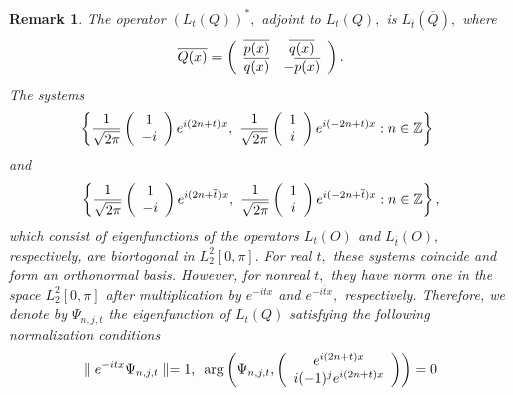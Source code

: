 \documentclass{article}%
\newtheorem{remark}{Remark}
\begin{document}
\begin{remark}
The operator $\left(  L_{t}(Q)\right)  ^{\ast},$ adjoint to $L_{t}(Q),$ is
$L_{\overline{t}}(\overline{Q}),$ where
\[
\overline{Q(x)}=\left(
\begin{array}
[c]{cc}%
\overline{p(x)} & \overline{q(x)}\\
\overline{q(x)} & -\overline{p(x)}%
\end{array}
\right)  .
\]
The systems
\[
\left\{  \frac{1}{\sqrt{2\pi}}\left(
\begin{array}
[c]{c}%
1\\
-i
\end{array}
\right)  e^{i(2n+t)x},\text{ }\frac{1}{\sqrt{2\pi}}\left(
\begin{array}
[c]{c}%
1\\
i
\end{array}
\right)  e^{i(-2n+t)x}:n\in\mathbb{Z}\right\}  \text{ }%
\]
and
\[
\left\{  \frac{1}{\sqrt{2\pi}}\left(
\begin{array}
[c]{c}%
1\\
-i
\end{array}
\right)  e^{i(2n+\overline{t})x},\text{ }\frac{1}{\sqrt{2\pi}}\left(
\begin{array}
[c]{c}%
1\\
i
\end{array}
\right)  e^{i(-2n+\overline{t})x}:n\in\mathbb{Z}\right\}  ,
\]
which consist of eigenfunctions of the operators $L_{t}(O)$ and $L_{\overline
{t}}(O),$ respectively, are biortogonal in $L_{2}^{2}[0,\pi].$ For real $t,$
these systems coincide and form an orthonormal basis. However, for nonreal
$t,$ they have norm one in the space $L_{2}^{2}[0,\pi]$ after multiplication
by $e^{-itx}$ and $e^{-i\overline{t}x},$ respectively. Therefore, we denote by
$\Psi_{n,j,t}$ the eigenfunction of $L_{t}(Q)$ satisfying the following
normalization conditions
\[
\parallel e^{-itx}\Psi_{n,j,t}\parallel=1,\text{ }\arg\left(  \Psi
_{n,j,t},\left(
\begin{array}
[c]{c}%
e^{i(2n+t)x}\\
i(-1)^{j}e^{i(2n+t)x}%
\end{array}
\right)  \right)  =0
\]

\end{remark}
\end{document}
